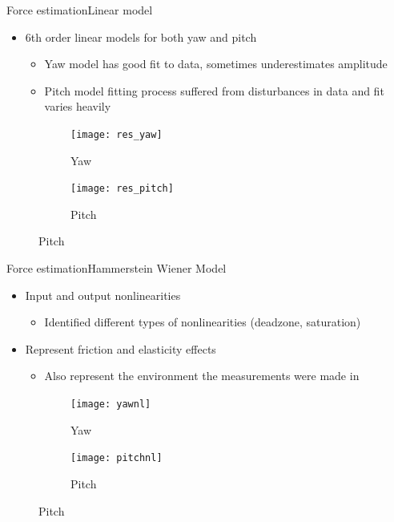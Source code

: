 \begin{frame}{Force estimation}{Linear model}
\begin{itemize}
\item 6th order linear models for both yaw and pitch
\begin{itemize}
\item Yaw model has good fit to data, sometimes underestimates amplitude
\item Pitch model fitting process suffered from disturbances in data and fit varies heavily
\end{itemize}
\end{itemize}
\begin{figure}
\centering
    \begin{subfigure}[t]{0.49\textwidth}
        \centering
        \texttt{[image: res\_yaw]} 
        \caption{Yaw} \label{fig:yawres}
    \end{subfigure}
        \begin{subfigure}[t]{0.49\textwidth}
        \centering
        \texttt{[image: res\_pitch]} 
        \caption{Pitch} \label{fig:pitchres}
    \end{subfigure}
\end{figure}
\end{frame}

\begin{frame}{Force estimation}{Hammerstein Wiener Model}
\begin{itemize}
  \item Input and output nonlinearities
  \begin{itemize}
    \item Identified different types of nonlinearities (deadzone, saturation)
  \end{itemize}  
  \item Represent friction and elasticity effects
  \begin{itemize}
  	\item Also represent the environment the measurements were made in
  \end{itemize}
\end{itemize}

\begin{figure}
\centering
    \begin{subfigure}[t]{0.49\textwidth}
        \centering
        \texttt{[image: yawnl]} 
        \caption{Yaw} \label{fig:yawresnl}
    \end{subfigure}
        \begin{subfigure}[t]{0.49\textwidth}
        \centering
        \texttt{[image: pitchnl]} 
        \caption{Pitch} \label{fig:pitchresnl}
    \end{subfigure}
\end{figure}
\end{frame}

